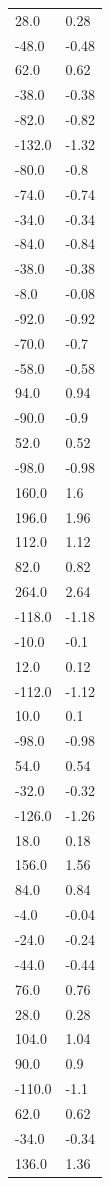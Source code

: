 \begin{longtable}{ll}
28.0 & 0.28 \\
-48.0 & -0.48 \\
62.0 & 0.62 \\
-38.0 & -0.38 \\
-82.0 & -0.82 \\
-132.0 & -1.32 \\
-80.0 & -0.8 \\
-74.0 & -0.74 \\
-34.0 & -0.34 \\
-84.0 & -0.84 \\
-38.0 & -0.38 \\
-8.0 & -0.08 \\
-92.0 & -0.92 \\
-70.0 & -0.7 \\
-58.0 & -0.58 \\
94.0 & 0.94 \\
-90.0 & -0.9 \\
52.0 & 0.52 \\
-98.0 & -0.98 \\
160.0 & 1.6 \\
196.0 & 1.96 \\
112.0 & 1.12 \\
82.0 & 0.82 \\
264.0 & 2.64 \\
-118.0 & -1.18 \\
-10.0 & -0.1 \\
12.0 & 0.12 \\
-112.0 & -1.12 \\
10.0 & 0.1 \\
-98.0 & -0.98 \\
54.0 & 0.54 \\
-32.0 & -0.32 \\
-126.0 & -1.26 \\
18.0 & 0.18 \\
156.0 & 1.56 \\
84.0 & 0.84 \\
-4.0 & -0.04 \\
-24.0 & -0.24 \\
-44.0 & -0.44 \\
76.0 & 0.76 \\
28.0 & 0.28 \\
104.0 & 1.04 \\
90.0 & 0.9 \\
-110.0 & -1.1 \\
62.0 & 0.62 \\
-34.0 & -0.34 \\
136.0 & 1.36 \\

\end{longtable}
